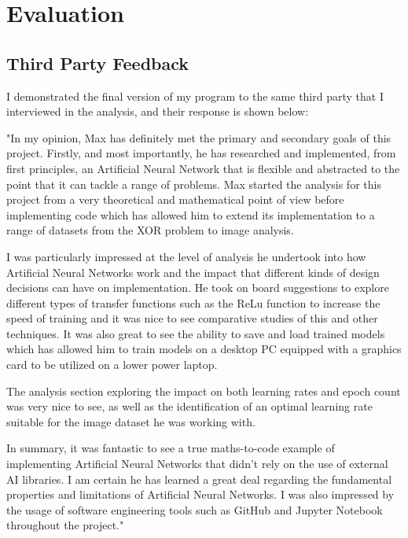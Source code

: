 \documentclass[./project-report/src/latex/project-report.tex]{subfiles}
\begin{document}
\maketitle

\clearpage
\section{Evaluation}

\subsection{Third Party Feedback}

I demonstrated the final version of my program to the same third party that I interviewed in the analysis, and their response is shown below:

\vspace{5mm}

"In my opinion, Max has definitely met the primary and secondary goals of this project. Firstly, and most importantly, he has researched and implemented, from first 
principles, an Artificial Neural Network that is flexible and abstracted to the point that it can tackle a range of problems. Max started the analysis for this 
project from a very theoretical and mathematical point of view before implementing code which has allowed him to extend its implementation to a range of datasets 
from the XOR problem to image analysis.

I was particularly impressed at the level of analysis he undertook into how Artificial Neural Networks work and the impact that different kinds of design decisions can have on 
implementation. He took on board suggestions to explore different types of transfer functions such as the ReLu function to increase the speed of training and it was nice 
to see comparative studies of this and other techniques. It was also great to see the ability to save and load trained models which has allowed him to train models 
on a desktop PC equipped with a graphics card to be utilized on a lower power laptop.

The analysis section exploring the impact on both learning rates and epoch count was very nice to see, as well as the identification of an optimal learning rate 
suitable for the image dataset he was working with.

In summary, it was fantastic to see a true maths-to-code example of implementing Artificial Neural Networks that didn't rely on the use of external AI libraries. I 
am certain he has learned a great deal regarding the fundamental properties and limitations of Artificial Neural Networks. I was also impressed by the usage of 
software engineering tools such as GitHub and Jupyter Notebook throughout the project."
\end{document}
